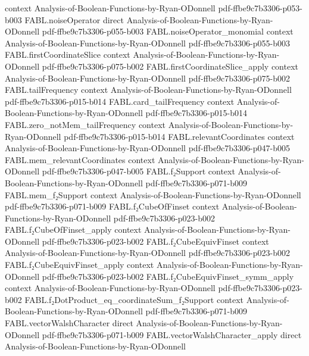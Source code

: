 \begin{theorem}
  {context}
  {Analysis-of-Boolean-Functions-by-Ryan-ODonnell}
  {pdf-ffbe9c7b3306-p053-b003}
\proofstep
  {FABL.noiseOperator}
  {direct}
  {Analysis-of-Boolean-Functions-by-Ryan-ODonnell}
  {pdf-ffbe9c7b3306-p055-b003}
\proofstep
  {FABL.noiseOperator_monomial}
  {context}
  {Analysis-of-Boolean-Functions-by-Ryan-ODonnell}
  {pdf-ffbe9c7b3306-p055-b003}
\proofstep
  {FABL.firstCoordinateSlice}
  {context}
  {Analysis-of-Boolean-Functions-by-Ryan-ODonnell}
  {pdf-ffbe9c7b3306-p075-b002}
\proofstep
  {FABL.firstCoordinateSlice_apply}
  {context}
  {Analysis-of-Boolean-Functions-by-Ryan-ODonnell}
  {pdf-ffbe9c7b3306-p075-b002}
\proofstep
  {FABL.tailFrequency}
  {context}
  {Analysis-of-Boolean-Functions-by-Ryan-ODonnell}
  {pdf-ffbe9c7b3306-p015-b014}
\proofstep
  {FABL.card_tailFrequency}
  {context}
  {Analysis-of-Boolean-Functions-by-Ryan-ODonnell}
  {pdf-ffbe9c7b3306-p015-b014}
\proofstep
  {FABL.zero_notMem_tailFrequency}
  {context}
  {Analysis-of-Boolean-Functions-by-Ryan-ODonnell}
  {pdf-ffbe9c7b3306-p015-b014}
\proofstep
  {FABL.relevantCoordinates}
  {context}
  {Analysis-of-Boolean-Functions-by-Ryan-ODonnell}
  {pdf-ffbe9c7b3306-p047-b005}
\proofstep
  {FABL.mem_relevantCoordinates}
  {context}
  {Analysis-of-Boolean-Functions-by-Ryan-ODonnell}
  {pdf-ffbe9c7b3306-p047-b005}
\proofstep
  {FABL.f₂Support}
  {context}
  {Analysis-of-Boolean-Functions-by-Ryan-ODonnell}
  {pdf-ffbe9c7b3306-p071-b009}
\proofstep
  {FABL.mem_f₂Support}
  {context}
  {Analysis-of-Boolean-Functions-by-Ryan-ODonnell}
  {pdf-ffbe9c7b3306-p071-b009}
\proofstep
  {FABL.f₂CubeOfFinset}
  {context}
  {Analysis-of-Boolean-Functions-by-Ryan-ODonnell}
  {pdf-ffbe9c7b3306-p023-b002}
\proofstep
  {FABL.f₂CubeOfFinset_apply}
  {context}
  {Analysis-of-Boolean-Functions-by-Ryan-ODonnell}
  {pdf-ffbe9c7b3306-p023-b002}
\proofstep
  {FABL.f₂CubeEquivFinset}
  {context}
  {Analysis-of-Boolean-Functions-by-Ryan-ODonnell}
  {pdf-ffbe9c7b3306-p023-b002}
\proofstep
  {FABL.f₂CubeEquivFinset_apply}
  {context}
  {Analysis-of-Boolean-Functions-by-Ryan-ODonnell}
  {pdf-ffbe9c7b3306-p023-b002}
\proofstep
  {FABL.f₂CubeEquivFinset_symm_apply}
  {context}
  {Analysis-of-Boolean-Functions-by-Ryan-ODonnell}
  {pdf-ffbe9c7b3306-p023-b002}
\proofstep
  {FABL.f₂DotProduct_eq_coordinateSum_f₂Support}
  {context}
  {Analysis-of-Boolean-Functions-by-Ryan-ODonnell}
  {pdf-ffbe9c7b3306-p071-b009}
\proofstep
  {FABL.vectorWalshCharacter}
  {direct}
  {Analysis-of-Boolean-Functions-by-Ryan-ODonnell}
  {pdf-ffbe9c7b3306-p071-b009}
\proofstep
  {FABL.vectorWalshCharacter_apply}
  {direct}
  {Analysis-of-Boolean-Functions-by-Ryan-ODonnell}

\end{theorem}
